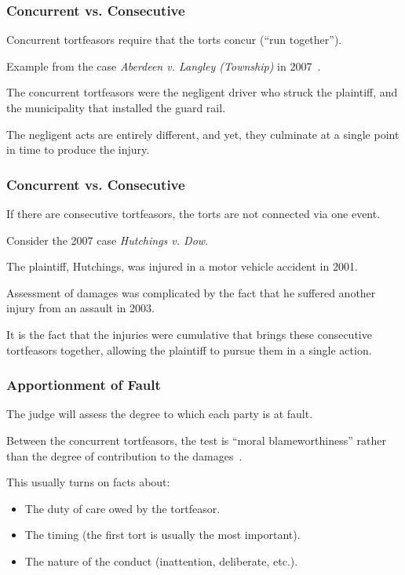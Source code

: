 \begin{frame}
\frametitle{Concurrent vs. Consecutive}

Concurrent tortfeasors require that the torts concur (``run together'').

Example from the case \textit{Aberdeen v. Langley (Township)} in 2007~\cite{ct}.

The concurrent tortfeasors were the negligent driver who struck the plaintiff, and the municipality that installed the guard rail.

The negligent acts are entirely different, and yet, they culminate at a single point in time to produce the injury.

\end{frame}



\begin{frame}
\frametitle{Concurrent vs. Consecutive}

If there are consecutive tortfeasors, the torts are not connected via one event.

Consider the 2007 case \textit{Hutchings v. Dow}.

The plaintiff, Hutchings, was injured in a motor vehicle accident in 2001.

Assessment of damages was complicated by the fact that he suffered another injury from an assault in 2003.

It is the fact that the injuries were cumulative that brings these consecutive tortfeasors together, allowing the plaintiff to pursue them in a single action.

\end{frame}



\begin{frame}
\frametitle{Apportionment of Fault}

The judge will assess the degree to which each party is at fault.

Between the concurrent tortfeasors, the test is ``moral blameworthiness'' rather than the degree of contribution to the damages~\cite{ct}.

This usually turns on facts about:

\begin{itemize}
	\item The duty of care owed by the tortfeasor.
	\item The timing (the first tort is usually the most important).
	\item The nature of the conduct (inattention, deliberate, etc.).
\end{itemize}

\end{frame}



